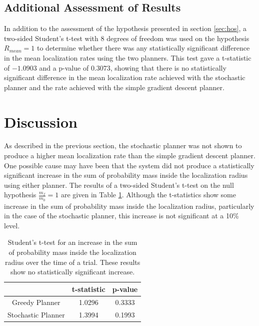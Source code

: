 \documentclass[submit, 12pt]{aiaa-pretty-modified}
\begin{document}
\subsection{Additional Assessment of Results}
\label{sec:additional}
In addition to the assessment of the hypothesis presented in section \ref{sec:hos}, a two-sided Student's
t-test with 8 degrees of freedom was used on the hypothesis $R_{mean}
= 1$ to determine whether there was any statistically significant
difference in the mean localization rates using the two planners.  This test gave
a t-statistic of $-1.0903$ and a p-value of $0.3073$, showing that
there is no statistically significant difference in the mean localization
rate achieved with the stochastic planner and the rate achieved with
the simple gradient descent planner.

\section{Discussion}
\label{sec:discussion}
As described in the previous section, the stochastic planner was not
shown to produce a higher mean localization
rate than the simple gradient descent planner.  One possible cause may
have been
that the system did not produce a statistically significant increase
in the sum of probability mass inside the localization radius using
either planner.  The results of a two-sided Student's t-test on the
null hypothesis $\frac{m_f}{m_0} = 1$ are given in Table
\ref{tab:nofind}.  Although the t-statistics show some increase in the
sum of probability mass inside the localization radius,
particularly in the case of the stochastic planner, this increase is
not significant at a 10\% level.

\begin{table}[htb]
\begin{center}
\begin{tabular}{|c||c|c|}
\hline
& t-statistic & p-value \\
\hline \hline
Greedy Planner & 1.0296 & 0.3333\\
\hline
Stochastic Planner& 1.3994 &0.1993\\
\hline
\end{tabular}
\caption[Student's t-test on probability mass increase inside
localization radius.]{Student's t-test for an increase in the sum of probability
  mass inside the localization radius over the time of a trial.
  These results show no statistically significant increase.}
\label{tab:nofind}
\end{center}
\end{table}
\end{document}
